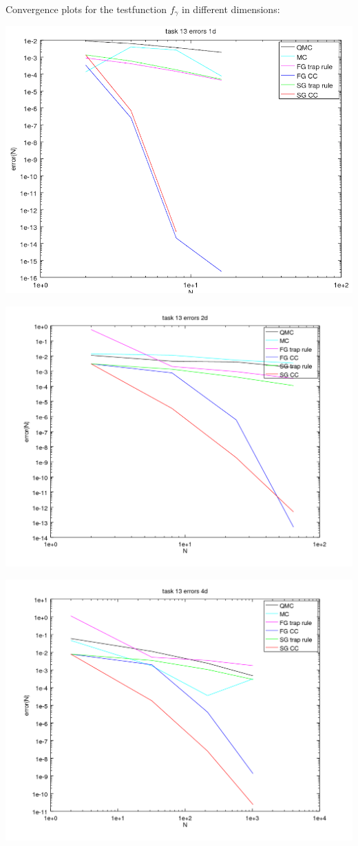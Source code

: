 \documentclass[10pt,a4paper]{article}
\begin{document}
Convergence plots for the testfunction $f_\gamma$ in different dimensions:
\begin{center}
\includegraphics[scale=0.5]{task_13_d1.png}
\end{center}
\begin{center}
\includegraphics[scale=0.5]{task_13_d2.png}
\end{center}
\begin{center}
\includegraphics[scale=0.5]{task_13_d4.png}
\end{center}
\end{document}
